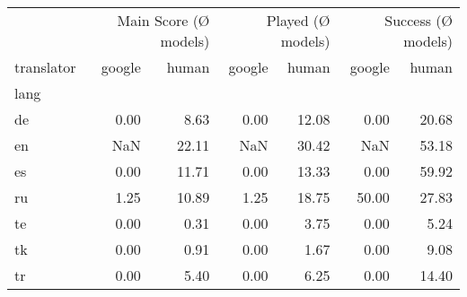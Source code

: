 \begin{tabular}{lrrrrrr}
\toprule
 & \multicolumn{2}{r}{Main Score (Ø models)} & \multicolumn{2}{r}{Played (Ø models)} & \multicolumn{2}{r}{Success (Ø models)} \\
translator & google & human & google & human & google & human \\
lang &  &  &  &  &  &  \\
\midrule
de & 0.00 & 8.63 & 0.00 & 12.08 & 0.00 & 20.68 \\
en & NaN & 22.11 & NaN & 30.42 & NaN & 53.18 \\
es & 0.00 & 11.71 & 0.00 & 13.33 & 0.00 & 59.92 \\
ru & 1.25 & 10.89 & 1.25 & 18.75 & 50.00 & 27.83 \\
te & 0.00 & 0.31 & 0.00 & 3.75 & 0.00 & 5.24 \\
tk & 0.00 & 0.91 & 0.00 & 1.67 & 0.00 & 9.08 \\
tr & 0.00 & 5.40 & 0.00 & 6.25 & 0.00 & 14.40 \\
\bottomrule
\end{tabular}
